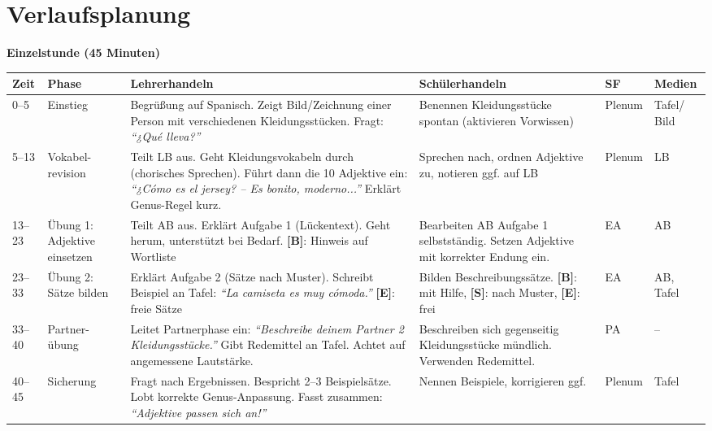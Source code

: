 \documentclass[11pt,a4paper]{article}
\newcommand{\basis}{\textcolor{basisgreen}{\textbf{[B]}}}
\newcommand{\standard}{\textcolor{standardblue}{\textbf{[S]}}}
\newcommand{\erweiterung}{\textcolor{erweiterungpurple}{\textbf{[E]}}}
\begin{document}
\section{Verlaufsplanung}

\textbf{Einzelstunde (45 Minuten)}

\begin{longtable}{|p{1.2cm}|p{1.8cm}|p{4.5cm}|p{3.5cm}|p{1.2cm}|p{1.5cm}|}
\hline
\textbf{Zeit} & \textbf{Phase} & \textbf{Lehrerhandeln} & \textbf{Schülerhandeln} & \textbf{SF} & \textbf{Medien} \\
\hline
\endhead

0--5 & Einstieg &
Begrüßung auf Spanisch. Zeigt Bild/Zeichnung einer Person mit verschiedenen Kleidungsstücken. Fragt: \textit{``¿Qué lleva?''} &
Benennen Kleidungsstücke spontan (aktivieren Vorwissen) &
Plenum &
Tafel/ Bild \\
\hline

5--13 & Vokabel-revision &
Teilt LB aus. Geht Kleidungsvokabeln durch (chorisches Sprechen). Führt dann die 10 Adjektive ein: \textit{``¿Cómo es el jersey? -- Es bonito, moderno...''} Erklärt Genus-Regel kurz. &
Sprechen nach, ordnen Adjektive zu, notieren ggf. auf LB &
Plenum &
LB \\
\hline

13--23 & Übung 1: Adjektive einsetzen &
Teilt AB aus. Erklärt Aufgabe 1 (Lückentext). Geht herum, unterstützt bei Bedarf. \basis{}: Hinweis auf Wortliste &
Bearbeiten AB Aufgabe 1 selbstständig. Setzen Adjektive mit korrekter Endung ein. &
EA &
AB \\
\hline

23--33 & Übung 2: Sätze bilden &
Erklärt Aufgabe 2 (Sätze nach Muster). Schreibt Beispiel an Tafel: \textit{``La camiseta es muy cómoda.''} \erweiterung{}: freie Sätze &
Bilden Beschreibungssätze. \basis{}: mit Hilfe, \standard{}: nach Muster, \erweiterung{}: frei &
EA &
AB, Tafel \\
\hline

33--40 & Partner-übung &
Leitet Partnerphase ein: \textit{``Beschreibe deinem Partner 2 Kleidungsstücke.''} Gibt Redemittel an Tafel. Achtet auf angemessene Lautstärke. &
Beschreiben sich gegenseitig Kleidungsstücke mündlich. Verwenden Redemittel. &
PA &
-- \\
\hline

40--45 & Sicherung &
Fragt nach Ergebnissen. Bespricht 2--3 Beispielsätze. Lobt korrekte Genus-Anpassung. Fasst zusammen: \textit{``Adjektive passen sich an!''} &
Nennen Beispiele, korrigieren ggf. &
Plenum &
Tafel \\
\hline

\end{longtable}
\end{document}
